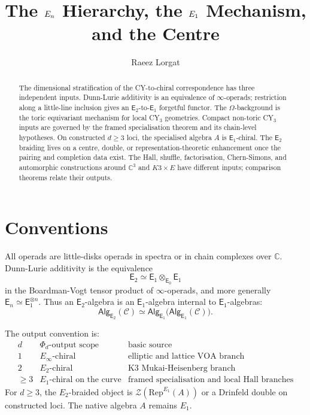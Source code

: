 \documentclass[11pt]{amsart}
\title{The $\En$ Hierarchy, the $\Eone$ Mechanism, and the Centre}
\author{Raeez Lorgat}
\date{}
\theoremstyle{definition}
\theoremstyle{remark}
\newcommand{\En}{\mathsf{E}_n}
\newcommand{\Eone}{\mathsf{E}_1}
\newcommand{\Etwo}{\mathsf{E}_2}
\newcommand{\Ezero}{\mathsf{E}_0}
\newcommand{\Rep}{\mathrm{Rep}}
\newcommand{\cZ}{\mathcal{Z}}
\newcommand{\cC}{\mathcal{C}}
\newcommand{\C}{\mathbb{C}}
\begin{document}
\maketitle

\begin{abstract}
The dimensional stratification of the CY-to-chiral correspondence has
three independent inputs.  Dunn-Lurie additivity is an equivalence of
$\infty$-operads; restriction along a little-line inclusion gives an
$\Etwo$-to-$\Eone$ forgetful functor.  The $\Omega$-background is the
toric equivariant mechanism for local CY$_3$ geometries.  Compact
non-toric CY$_3$ inputs are governed by the framed specialisation
theorem and its chain-level hypotheses.  On constructed $d\geq 3$ loci,
the specialised algebra $A$ is $\Eone$-chiral.  The $\Etwo$ braiding
lives on a centre, double, or representation-theoretic enhancement once
the pairing and completion data exist.  The Hall, shuffle, factorisation,
Chern-Simons, and automorphic constructions around $\C^3$ and
$K3\times E$ have different inputs; comparison theorems relate their
outputs.
\end{abstract}

\section{Conventions}

All operads are little-disks operads in spectra or in chain complexes
over $\C$.  Dunn-Lurie additivity is the equivalence
\begin{equation}
  \Etwo \simeq \Eone\otimes_{\Ezero}\Eone
  \label{eq:dunn}
\end{equation}
in the Boardman-Vogt tensor product of $\infty$-operads, and more
generally $\En\simeq\Eone^{\otimes n}$.  Thus an $\Etwo$-algebra is an
$\Eone$-algebra internal to $\Eone$-algebras:
\begin{equation}
  \mathsf{Alg}_{\Etwo}(\cC)
  \simeq
  \mathsf{Alg}_{\Eone}\bigl(\mathsf{Alg}_{\Eone}(\cC)\bigr).
  \label{eq:dunn-iterated}
\end{equation}

The output convention is:
\[
\begin{array}{c|c|c}
d & \Phi_d\text{-output scope} & \text{basic source} \\
\hline
1 & E_\infty\text{-chiral} & \text{elliptic and lattice VOA branch}\\
2 & E_2\text{-chiral} & \text{K3 Mukai-Heisenberg branch}\\
\geq 3 & E_1\text{-chiral on the curve} &
\text{framed specialisation and local Hall branches}
\end{array}
\]
For $d\geq 3$, the $E_2$-braided object is
$\cZ(\Rep^{E_1}(A))$ or a Drinfeld double on constructed loci.  The
native algebra $A$ remains $E_1$.
\end{document}
